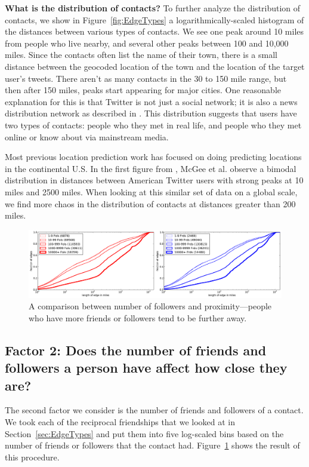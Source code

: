 \documentclass[letterpaper]{article}
\begin{document}
\noindent\textbf{What is the distribution of contacts?} To further analyze the distribution of contacts, we show in Figure~\ref{fig:EdgeTypes} a logarithmically-scaled
histogram of the distances between various types of contacts.
%
We see one peak around 10 miles from people who live nearby, and several
other peaks between 100 and 10,000 miles.
%
Since the contacts often list the name of their town, there is a small distance
between the geocoded location of the town and the location of the target
user's tweets.
%
There aren't as many contacts in the 30 to 150 mile range, but then after 150
miles, peaks start appearing for major cities.
%
One reasonable explanation for this is that Twitter is not just a social
network; it is also a news distribution network as described in
\cite{kwak2010why}.
%
This distribution suggests that users have two types of contacts: people who
they met in real life, and people who they met online or know about via
mainstream media.

Most previous location prediction work has focused on doing predicting
locations in the continental U.S.
%
In the first figure from \cite{mcgee2011geographic}, McGee et al. observe a
bimodal distribution in distances between American Twitter users with strong
peaks at 10 miles and 2500 miles.
%
When looking at this similar set of data on a global scale, we find more chaos
in the distribution of contacts at distances greater than 200 miles.

\begin{figure}[tb]
\centering
\includegraphics[width=\linewidth]{figures/edge_counts.pdf}
\caption{
A comparison between number of followers and proximity---people who have more
friends or followers tend to be further away.
}
\label{fig:EdgeCounts}
\end{figure}

\subsection{Factor 2: Does the number of friends and followers a person have affect how
close they are?}

%
The second factor we consider is the number of friends and followers of a contact. %
%
We took each of the reciprocal friendships that we looked at in
Section~\ref{sec:EdgeTypes} and put them into five log-scaled bins based on
the number of friends or followers that the contact had.
%
Figure~\ref{fig:EdgeCounts} shows the result of this procedure.
\end{document}
